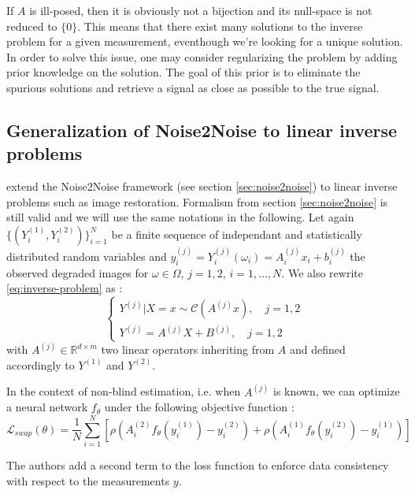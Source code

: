 If $A$ is ill-posed, then it is obviously not a bijection and its null-space is not reduced to $\{0\}$.
This means that there exist many solutions to the inverse problem for a given measurement, eventhough we're looking for a unique solution.
In order to solve this issue, one may consider regularizing the problem by adding prior knowledge on the solution. The goal of this prior is to eliminate the spurious solutions and retrieve a signal as close as possible to the true signal.



\subsection{Generalization of Noise2Noise to linear inverse problems}

\cite{xia_training_nodate} extend the Noise2Noise framework (see section \ref{sec:noise2noise}) to linear inverse problems such as image restoration.
Formalism from section \ref{sec:noise2noise} is still valid and we will use the same notations in the following.
Let again $\{(Y_i^{(1)}, Y_i^{(2)})\}_{i=1}^N$ be a finite sequence of independant and statistically distributed random variables and $y_i^{(j)} = Y_i^{(j)}(\omega_i) = A_i^{(j)}x_i + b_i^{(j)}$ the observed degraded images for $\omega \in \Omega$, $j = 1, 2$, $i = 1, \dots, N$.
We also rewrite \ref{eq:inverse-problem} as :
\begin{equation}
    \begin{cases}
        Y^{(j)} | X=x \sim \mathcal{C}(A^{(j)}x), \quad j = 1, 2 \\
        Y^{(j)} = A^{(j)} X + B^{(j)}, \quad j = 1, 2
    \end{cases}
\end{equation}
with $A^{(j)} \in \mathbb{R}^{d \times m}$ two linear operators inheriting from $A$ and defined accordingly to $Y^{(1)}$ and $Y^{(2)}$.

In the context of non-blind estimation, i.e. when $A^{(j)}$ is known, we can optimize a neural network $f_{\theta}$ under the following objective function :
\begin{equation}
    \mathcal{L}_{swap}(\theta) = \frac{1}{N} \sum_{i=1}^N \left[ \rho(A_i^{(2)} f_{\theta}(y_i^{(1)}) - y_i^{(2)}) + \rho(A_i^{(1)} f_{\theta}(y_i^{(2)}) - y_i^{(1)}) \right]
    \label{eq:xia_swap_loss}
\end{equation}

The authors add a second term to the loss function to enforce data consistency with respect to the measurements $y$.

